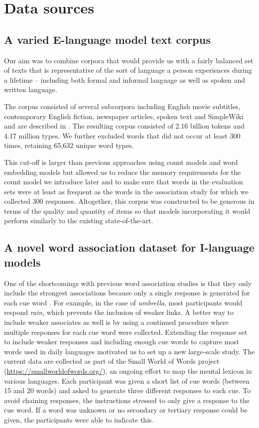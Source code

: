 \documentclass{article}
\begin{document}
\section{Data sources}
\label{sec:data}

\subsection{A varied E-language model text corpus}
Our aim was to combine corpora that would provide us with a fairly balanced set of texts that is representative of the sort of language a person experiences during a lifetime -- including both formal and informal language as well as spoken and written language.

The corpus consisted of several subcorpora including English movie subtitles, contemporary English fiction, newspaper articles, spoken text and SimpleWiki and are described in \cite{DeDeyne2016ACL}. The resulting corpus consisted of 2.16 billion tokens and 4.17 million types. We further excluded words that did not occur at least 300 times, retaining 65,632 unique word types.

This cut-off is larger than previous approaches using count models and word embedding models but allowed us to reduce the memory requirements for the count model we introduce later and to make sure that words in the evaluation sets were at least as frequent as the words in the association study for which we collected 300 responses. Altogether, this corpus was constructed to be generous in terms of the quality and quantity of items so that models incorporating it would perform similarly to the existing state-of-the-art.

\subsection{A novel word association dataset for I-language models}

One of the shortcomings with previous word association studies is that they only include the strongest associations because only a single response is generated for each cue word \cite{Kiss1973,Nelson2004}. For example, in the case of \textit{umbrella}, most participants would respond \textit{rain}, which prevents the inclusion of weaker links. A better way to include weaker associates as well is by using a continued procedure where multiple responses for each cue word were collected. Extending the response set to include weaker responses and including enough cue words to capture most words used in daily languages motivated us to set up a new large-scale study. The current data are collected as part of the Small World of Words project (\url{https://smallworldofwords.org/}), an ongoing effort to map the mental lexicon in various languages. Each participant was given a short list of cue words (between 15 and 20 words)  and asked to generate three different responses to each cue. To avoid chaining responses, the instructions stressed to only give a response to the cue word. If a word was unknown or no secondary or tertiary response could be given, the participants were able to indicate this.
\end{document}
